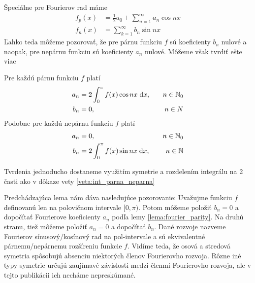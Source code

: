 Špeciálne pre Fourierov rad máme
\begin{align*}
    f_p(x) &= \frac{1}{2} a_0 + \sum_{n=1}^{\infty} a_n \cos n x \\
    f_n(x) &= \sum_{k=1}^{\infty} b_n \sin n x
\end{align*}
Ľahko teda môžeme pozorovať, že pre párnu funkciu $f$ sú koeficienty
$b_n$ nulové a naopak, pre nepárnu funkciu sú koeficienty $a_n$
nulové. Môžeme však tvrdiť ešte viac
\begin{lema}
    Pre každú párnu funkciu $f$ platí
    \begin{align*}
        a_n &= 2 \int_0^{\pi} f(x) \cos n x \; \mathrm{d} x, \quad & n \in \mathbb{N}_0 \\
        b_n &= 0, \quad& n\in N
    \end{align*}
    Podobne pre každú nepárnu funkciu $f$ platí
    \begin{align*}
        a_n &= 0, \quad& n\in \mathbb{N}_0 \\
        b_n &= 2 \int_0^{\pi} f(x) \sin n x \; \mathrm{d} x, \quad & n \in \mathbb{N}
    \end{align*}
    \label{lema:fourier_parity}
\end{lema}
\begin{dokaz}
    Tvrdenia jednoducho dostaneme využitím symetrie a rozdelením
    integrálu na 2 časti ako v dôkaze vety \ref{veta:int_parna_neparna}
\end{dokaz}
Predchádzajúca lema nám dáva nasledujúce pozorovanie: Uvažujme funkciu $f$ 
definovanú len na polovičnom intervale $[0,\pi)$. Potom môžeme
položiť $b_n=0$ a dopočítať Fourierove koeficienty $a_n$ podľa lemy
\ref{lema:fourier_parity}. Na druhú stranu, tiež môžeme položiť
$a_n=0$ a dopočítať $b_n$. Dané rozvoje nazveme Fourierov
sínusový/kosínový rad na pol-intervale a sú ekvivalentné párnemu/nepárnemu
rozšíreniu funkcie $f$. Vidíme teda, že osová a stredová symetria
spôsobujú absenciu niektorých členov Fourierovho rozvoja. Rôzne iné typy
symetrie určujú zaujímavé závislosti medzi členmi Fourierovho rozvoja,
ale v tejto publikácii ich necháme nepreskúmané.

